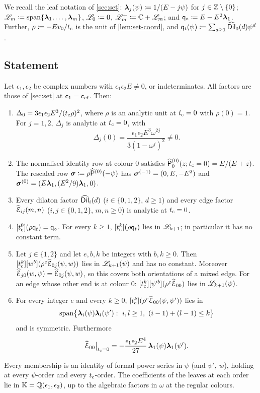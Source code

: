 We recall the leaf notation of \cref{sec:set}: $\boldsymbol{\lambda}_j(\psi)\coloneqq1/(E-j\psi)$ for $j\in\mathbb{Z}\setminus\{0\}$; $\mathscr{L}_m\coloneqq\mathrm{span}\{\boldsymbol{\lambda}_1,\dots,\boldsymbol{\lambda}_m\}$, $\mathscr{L}_0\coloneqq0$, $\mathscr{L}_m^{+}\coloneqq\mathbb{C}+\mathscr{L}_m$; and $\mathsf{q}_{\circ}\coloneqq E-E^2\boldsymbol{\lambda}_1$. Further, $\rho\coloneqq-Ev_0/t_{\mathrm{c}}$ is the unit of \cref{lem:set-coord}, and $\mathsf{q}_{t}(\psi)\coloneqq\sum_{d\ge1}\widehat{\mathsf{Dil}}_0(d)\psi^d$.

\subsection{Statement}

\begin{thm}\label{thm:lea-main}
Let $\epsilon_1,\epsilon_2$ be complex numbers with $\epsilon_1\epsilon_2E\neq0$, or indeterminates. All factors are those of \cref{sec:set} at $\mathsf{c}_{1}=\mathsf{c}_{\mathrm{cf}}$. Then:
\begin{enumerate}
\item[(F1)] $\Delta_0=3\epsilon_1\epsilon_2E^3/(t_{\mathrm{c}}\rho)^2$, where $\rho$ is an analytic unit at $t_{\mathrm{c}}=0$ with $\rho(0)=1$. For $j=1,2$, $\Delta_j$ is analytic at $t_{\mathrm{c}}=0$, with
\[
\Delta_j(0)=\frac{\epsilon_1\epsilon_2E^3\omega^{2j}}{3(1-\omega^j)^2}\neq0.
\]
\item[(F2)] The normalised identity row at colour $0$ satisfies $\widehat{\mathsf{P}}_0^{(0)}(z;t_{\mathrm{c}}=0)=E/(E+z)$. The rescaled row $\boldsymbol{\sigma}\coloneqq\rho\widehat{\mathsf{P}}^{(0)}(-\psi)$ has $\boldsymbol{\sigma}^{(-1)}=(0,E,-E^2)$ and $\boldsymbol{\sigma}^{(0)}=(E\boldsymbol{\lambda}_1,(E^2/9)\boldsymbol{\lambda}_1,0)$.
\item[(F3)] Every dilaton factor $\widehat{\mathsf{Dil}}_i(d)$ ($i\in\{0,1,2\}$, $d\ge1$) and every edge factor $\widehat{\mathcal{E}}_{ij}(m,n)$ ($i,j\in\{0,1,2\}$, $m,n\ge0$) is analytic at $t_{\mathrm{c}}=0$.
\item[(L1)] $[t_{\mathrm{c}}^0](\rho\mathsf{q}_{t})=\mathsf{q}_{\circ}$. For every $k\ge1$, $[t_{\mathrm{c}}^k](\rho\mathsf{q}_{t})$ lies in $\mathscr{L}_{k+1}$; in particular it has no constant term.
\item[(L2)] Let $j\in\{1,2\}$ and let $e,b,k$ be integers with $b,k\ge0$. Then $[t_{\mathrm{c}}^k][w^b](\rho^e\widehat{\mathcal{E}}_{0j}(\psi,w))$ lies in $\mathscr{L}_{k+1}(\psi)$ and has no constant. Moreover $\widehat{\mathcal{E}}_{j0}(w,\psi)=\widehat{\mathcal{E}}_{0j}(\psi,w)$, so this covers both orientations of a mixed edge. For an edge whose other end is at colour $0$: $[t_{\mathrm{c}}^k][\psi'^b](\rho^e\widehat{\mathcal{E}}_{00})$ lies in $\mathscr{L}_{k+1}(\psi)$.
\item[(L3)] For every integer $e$ and every $k\ge0$, $[t_{\mathrm{c}}^k](\rho^e\widehat{\mathcal{E}}_{00}(\psi,\psi'))$ lies in
\[
\mathrm{span}\bigl\{\lf_i(\psi)\lf_l(\psi'):\ i,l\ge1,\ (i-1)+(l-1)\le k\bigr\}
\]
and is symmetric. Furthermore
\[
\widehat{\mathcal{E}}_{00}\big|_{t_{\mathrm{c}}=0}=-\frac{\epsilon_1\epsilon_2E^4}{27}\,\boldsymbol{\lambda}_1(\psi)\boldsymbol{\lambda}_1(\psi').
\]
\end{enumerate}
Every membership is an identity of formal power series in $\psi$ (and $\psi'$, $w$), holding at every $\psi$-order and every $t_{\mathrm{c}}$-order. The coefficients of the leaves at each order lie in $\mathbb{K}=\mathbb{Q}(\epsilon_1,\epsilon_2)$, up to the algebraic factors in $\omega$ at the regular colours.
\end{thm}

